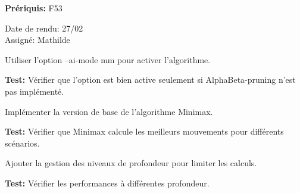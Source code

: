 \documentclass{article}
\begin{document}
\begin{needbox}

    \textbf{Prériquis:} F53
    \begin{duedatebox}
        Date de rendu: 27/02\\
        Assigné: Mathilde
    \end{duedatebox}
    \begin{subneedbox}
        Utiliser l'option --ai-mode mm pour activer l'algorithme.

        \textbf{Test:} Vérifier que l'option est bien active seulement si AlphaBeta-pruning n'est pas implémenté.
    \end{subneedbox}
    
    \begin{subneedbox}
        Implémenter la version de base de l’algorithme Minimax.

        \textbf{Test:} Vérifier que Minimax calcule les meilleurs mouvements pour différents scénarios.
    \end{subneedbox}
    
    \begin{subneedbox}
        Ajouter la gestion des niveaux de profondeur pour limiter les calculs.

        \textbf{Test:} Vérifier les performances à différentes profondeur.
    \end{subneedbox}
\end{needbox}
\end{document}
